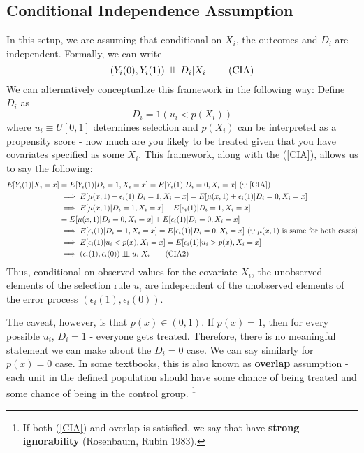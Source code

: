 \documentclass[12pt]{article}
\theoremstyle{definition}
\theoremstyle{property}
\theoremstyle{assumption}
\theoremstyle{example}
\theoremstyle{comment}
\begin{document}
\subsection{Conditional Independence Assumption}
In this setup, we are assuming that conditional on $X_i$, the outcomes and $D_i$ are independent. Formally, we can write
\[
 (Y_i(0), Y_i(1)) \perp \!\!\! \perp D_i|X_i \ \tag{\text{CIA}}\label{CIA}
\]
We can alternatively conceptualize this framework in the following way: Define $D_i$ as
\[
D_i = 1(u_i<p(X_i))
\]
where $u_i\equiv U[0,1]$ determines selection and $p(X_i)$ can be interpreted as a propensity score - how much are you likely to be treated given that you have covariates specified as some $X_i$. This framework, along with the (\ref{CIA}), allows us to say the following:
\footnotesize{\begin{align*}
E[Y_i(1)|X_i=x]&=E[Y_i(1)|D_i=1,X_i=x]=E[Y_i(1)|D_i=0,X_i=x] \ (\because \ref{CIA})\\
&\implies E[\mu(x,1)+\epsilon_i(1)|D_i=1,X_i=x]=E[\mu(x,1)+\epsilon_i(1)|D_i=0,X_i=x]\\
&\implies E[\mu(x,1)|D_i=1,X_i=x]-E[\epsilon_i(1)|D_i=1,X_i=x]\\
&=E[\mu(x,1)|D_i=0,X_i=x]+E[\epsilon_i(1)|D_i=0,X_i=x]\\
&\implies E[\epsilon_i(1)|D_i=1,X_i=x]=E[\epsilon_i(1)|D_i=0,X_i=x]\ (\because \mu(x,1)\text{ is same for both cases})\\
&\implies E[\epsilon_i(1)|u_i<p(x),X_i=x]=E[\epsilon_i(1)|u_i>p(x),X_i=x]\\
&\implies (\epsilon_i(1), \epsilon_i(0))\perp \!\!\! \perp u_i|X_i \tag{\text{CIA2}}\label{CIA2}
\end{align*}}\normalsize
Thus, conditional on observed values for the covariate $X_i$, the unobserved elements of the selection rule $u_i$ are independent of the unobserved elements of the error process $(\epsilon_i(1), \epsilon_i(0))$.\par
 The caveat, however, is that $p(x)\in(0,1)$. If $p(x)=1$, then for every possible $u_i$, $D_i=1$ - everyone gets treated. Therefore, there is no meaningful statement we can make about the $D_i=0$ case. We can say similarly for $p(x)=0$ case. In some textbooks, this is also known as \textbf{overlap} assumption - each unit in the defined population should have some chance of being treated and some chance of being in the control group. \footnote{If both (\ref{CIA}) and overlap is satisfied, we say that have \textbf{strong ignorability} (Rosenbaum, Rubin 1983).} \par
\end{document}
